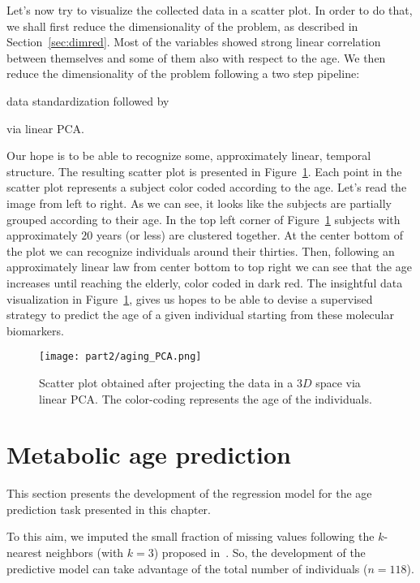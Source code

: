 Let's now try to visualize the collected data in a scatter plot. In order to do that, we shall first reduce the dimensionality of the problem, as described in Section~\ref{sec:dimred}.
Most of the variables showed strong linear correlation between themselves and some of them also with respect to the age. We then reduce the dimensionality of the problem following a two step pipeline:
\begin{enumerate*}[label=(\roman*)]
	\item data standardization followed by
	\item via linear PCA.
\end{enumerate*}
Our hope is to be able to recognize some, approximately linear, temporal structure. The resulting scatter plot is presented in Figure~\ref{fig:frassoni_PCA}.
Each point in the scatter plot represents a subject color coded according to the age.
Let's read the image from left to right.
As we can see, it looks like the subjects are partially grouped according to their age. In the top left corner of Figure~\ref{fig:frassoni_PCA} subjects with approximately $20$ years (or less) are clustered together. At the center bottom of the plot we can recognize individuals around their thirties. Then, following an approximately linear law from center bottom to top right we can see that the age increases until reaching the elderly, color coded in dark red.
The insightful data visualization in Figure~\ref{fig:frassoni_PCA}, gives us hopes to be able to devise a supervised strategy to predict the age of a given individual starting from these molecular biomarkers.

\begin{figure}[]
	\centering
	\texttt{[image: part2/aging\_PCA.png]}
	\caption{Scatter plot obtained after projecting the data in a $3D$ space via linear PCA. The color-coding represents the age of the individuals.} \label{fig:frassoni_PCA}
\end{figure}


\section{Metabolic age prediction} \label{sec:frassoni_regression}
This section presents the development of the regression model for the age prediction task presented in this chapter.

To this aim, we imputed the small fraction of missing values following the $k$-nearest neighbors (with $k=3$) proposed in~\cite{troyanskaya2001missing}. So, the development of the predictive model can take advantage of the total number of individuals ($n=118$).

